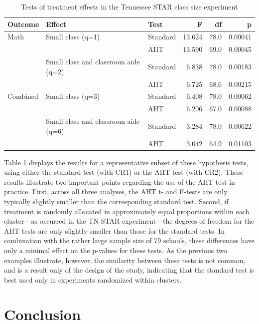\documentclass[draft]{ectaart}\usepackage[]{graphicx}\usepackage[]{color}
\begin{document}
\begin{table}[tbh]
\centering
\caption{Tests of treatment effects in the Tennessee STAR class size experiment} 
\label{tab:STAR}
\begin{tabular}{lllrrr}
  \toprule
Outcome & Effect & Test & F & df & p \\ 
  \midrule
Math & Small class (q=1) & Standard & 13.624 & 78.0 & 0.00041 \\ 
   &  & AHT & 13.590 & 69.0 & 0.00045 \\ 
   & Small class and classroom aide (q=2) & Standard & 6.838 & 78.0 & 0.00183 \\ 
   &  & AHT & 6.725 & 68.6 & 0.00215 \\ 
   \midrule
Combined & Small class (q=3) & Standard & 6.408 & 78.0 & 0.00062 \\ 
   &  & AHT & 6.206 & 67.0 & 0.00088 \\ 
   & Small class and classroom aide (q=6) & Standard & 3.284 & 78.0 & 0.00622 \\ 
   &  & AHT & 3.042 & 64.9 & 0.01103 \\ 
   \bottomrule
\end{tabular}
\end{table}


Table \ref{tab:STAR} displays the results for a representative subset of these hypothesis tests, using either the standard test (with CR1) or the AHT test (with CR2).
These results illustrate two important points regarding the use of the AHT test in practice.
First, across all three analyses, the AHT t- and F-tests are only typically slightly smaller than the corresponding standard test.
Second, if treatment is randomly allocated in approximately equal proportions within each cluster---as occurred in the TN STAR experiment---the degrees of freedom for the AHT tests are only slightly smaller than those for the standard tests.
In combination with the rather large sample size of 79 schools, these differences have only a minimal effect on the p-values for these tests. 
As the previous two examples illustrate, however, the similarity between these tests is not common, and is a result only of the design of the study, indicating that the standard test is best used only in experiments randomized within clusters. 

\section{Conclusion}
\label{sec:conclusion}
\end{document}
